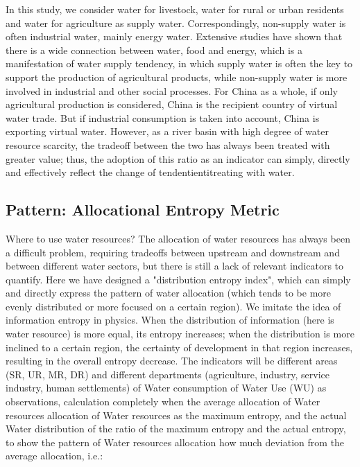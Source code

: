 \documentclass[9pt,twoside,lineno]{pnas-new}
\begin{document}
    In this study, we consider water for livestock, water for rural or urban residents and water for agriculture as supply water. Correspondingly, non-supply water is often industrial water, mainly energy water. Extensive studies have shown that there is a wide connection between water, food and energy, which is a manifestation of water supply tendency, in which supply water is often the key to support the production of agricultural products, while non-supply water is more involved in industrial and other social processes. For China as a whole, if only agricultural production is considered, China is the recipient country of virtual water trade. But if industrial consumption is taken into account, China is exporting virtual water. However, as a river basin with high degree of water resource scarcity, the tradeoff between the two has always been treated with greater value; thus, the adoption of this ratio as an indicator can simply, directly and effectively reflect the change of tendentientitreating with water.

\subsection*{Pattern: Allocational Entropy Metric}
    Where to use water resources? 
    The allocation of water resources has always been a difficult problem, requiring tradeoffs between upstream and downstream and between different water sectors, but there is still a lack of relevant indicators to quantify. Here we have designed a "distribution entropy index", which can simply and directly express the pattern of water allocation (which tends to be more evenly distributed or more focused on a certain region). We imitate the idea of information entropy in physics. When the distribution of information (here is water resource) is more equal, its entropy increases; when the distribution is more inclined to a certain region, the certainty of development in that region increases, resulting in the overall entropy decrease.
    The indicators will be different areas (SR, UR, MR, DR) and different departments (agriculture, industry, service industry, human settlements) of Water consumption of Water Use (WU) as observations, calculation completely when the average allocation of Water resources allocation of Water resources as the maximum entropy, and the actual Water distribution of the ratio of the maximum entropy and the actual entropy, to show the pattern of Water resources allocation how much deviation from the average allocation, i.e.:
    
\end{document}
